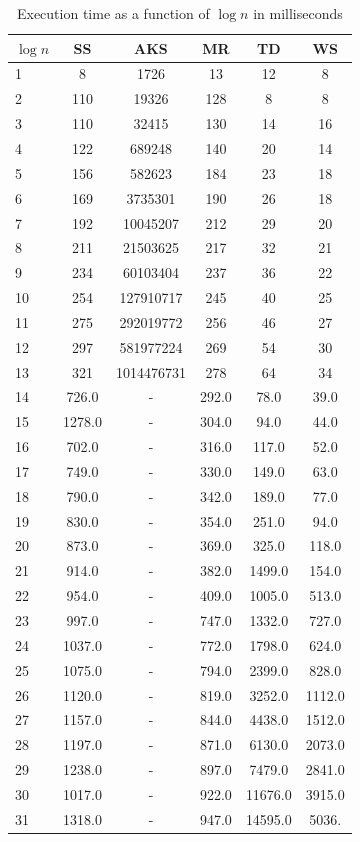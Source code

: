 \begin{table}
    \centering
    \caption{Execution time as a function of $\log n$ in milliseconds}
    \begin{tabular}{|l|c|c|c|c|c|} \hline
        $\log n$ & SS & AKS & MR & TD & WS \\
        \hline
1 & 8 & 1726 & 13 & 12 & 8 \\
2 & 110 & 19326 & 128 & 8 & 8 \\
3 & 110 & 32415 & 130 & 14 & 16 \\
4 & 122 & 689248 & 140 & 20 & 14 \\
5 & 156 & 582623 & 184 & 23 & 18 \\
6 & 169 & 3735301 & 190 & 26 & 18 \\
7 & 192 & 10045207 & 212 & 29 & 20 \\
8 & 211 & 21503625 & 217 & 32 & 21 \\
9 & 234 & 60103404 & 237 & 36 & 22 \\
10& 254 & 127910717 & 245 & 40 & 25 \\
11& 275 & 292019772 & 256 & 46 & 27 \\
12& 297 & 581977224 & 269 & 54 & 30 \\
13& 321 & 1014476731 & 278 & 64 & 34 \\
14& 726.0 & - & 292.0 & 78.0 & 39.0 \\
15& 1278.0 & - & 304.0 & 94.0 & 44.0 \\
16& 702.0 & - & 316.0 & 117.0 & 52.0 \\
17& 749.0 & - & 330.0 & 149.0 & 63.0 \\
18& 790.0 & - & 342.0 & 189.0 & 77.0 \\
19& 830.0 & - & 354.0 & 251.0 & 94.0 \\
20& 873.0 & - & 369.0 & 325.0 & 118.0 \\
21& 914.0 & - & 382.0 & 1499.0 & 154.0 \\
22& 954.0 & - & 409.0 & 1005.0 & 513.0 \\
23& 997.0 & - & 747.0 & 1332.0 & 727.0 \\
24& 1037.0 & - & 772.0 & 1798.0 & 624.0 \\
25& 1075.0 & - & 794.0 & 2399.0 & 828.0 \\
26& 1120.0 & - & 819.0 & 3252.0 & 1112.0 \\
27& 1157.0 & - & 844.0 & 4438.0 & 1512.0 \\
28& 1197.0 & - & 871.0 & 6130.0 & 2073.0 \\
29& 1238.0 & - & 897.0 & 7479.0 & 2841.0 \\
30& 1017.0 & - & 922.0 & 11676.0 & 3915.0 \\
31& 1318.0 & - & 947.0 & 14595.0 & 5036. \\
        \hline
    \end{tabular}
    \label{table:runtime}
\end{table}


